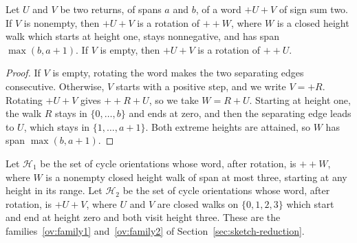 \begin{lemma}\label{height400:coalescence}
Let $U$ and $V$ be two returns, of spans $a$ and $b$, of a word $+U+V$ of sign sum two.
If $V$ is nonempty, then $+U+V$ is a rotation of $++W$, where $W$ is a closed height walk which starts at height one, stays nonnegative, and has span $\max(b,a+1)$.
If $V$ is empty, then $+U+V$ is a rotation of $++U$.
\end{lemma}
\begin{proof}
If $V$ is empty, rotating the word makes the two separating edges consecutive. Otherwise, $V$ starts with a positive step, and we write $V=+R$. Rotating $+U+V$ gives $++R+U$, so we take $W=R+U$. Starting at height one, the walk $R$ stays in $\{0,\ldots,b\}$ and ends at zero, and then the separating edge leads to $U$, which stays in $\{1,\ldots,a+1\}$. Both extreme heights are attained, so $W$ has span $\max(b,a+1)$.
\end{proof}

Let $\mathcal H_1$ be the set of cycle orientations whose word, after rotation, is $++W$, where $W$ is a nonempty closed
height walk of span at most three, starting at any height in its range. Let $\mathcal H_2$ be the set of cycle orientations whose word, after rotation, is $+U+V$, where $U$ and $V$ are closed walks on $\{0,1,2,3\}$ which start and end at height zero and both visit height three.
These are the families~\ref{ov:family1} and~\ref{ov:family2} of Section~\ref{sec:sketch-reduction}.

